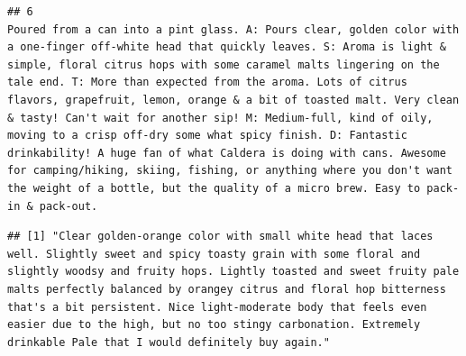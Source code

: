 \documentclass[
  a4paper,
]{article}
\newenvironment{Shaded}{\begin{snugshade}}{\end{snugshade}}
\newcommand{\DecValTok}[1]{\textcolor[rgb]{0.00,0.00,0.81}{#1}}
\newcommand{\NormalTok}[1]{#1}
\newcommand{\SpecialCharTok}[1]{\textcolor[rgb]{0.81,0.36,0.00}{\textbf{#1}}}
\begin{document}
\begin{verbatim}
## 6                                                                                                                                                                                                                                                                                                                                                                                                                                                                                                                                                                                                                                                                                                                                                                                                                                                                                                                                                                                                                                                                                                                                                                                                                                                                                                                                                                                                                               Poured from a can into a pint glass. A: Pours clear, golden color with a one-finger off-white head that quickly leaves. S: Aroma is light & simple, floral citrus hops with some caramel malts lingering on the tale end. T: More than expected from the aroma. Lots of citrus flavors, grapefruit, lemon, orange & a bit of toasted malt. Very clean & tasty! Can't wait for another sip! M: Medium-full, kind of oily, moving to a crisp off-dry some what spicy finish. D: Fantastic drinkability! A huge fan of what Caldera is doing with cans. Awesome for camping/hiking, skiing, fishing, or anything where you don't want the weight of a bottle, but the quality of a micro brew. Easy to pack-in & pack-out.
\end{verbatim}

\begin{Shaded}
\end{Shaded}

\begin{verbatim}
## [1] "Clear golden-orange color with small white head that laces well. Slightly sweet and spicy toasty grain with some floral and slightly woodsy and fruity hops. Lightly toasted and sweet fruity pale malts perfectly balanced by orangey citrus and floral hop bitterness that's a bit persistent. Nice light-moderate body that feels even easier due to the high, but no too stingy carbonation. Extremely drinkable Pale that I would definitely buy again."
\end{verbatim}
\end{document}
